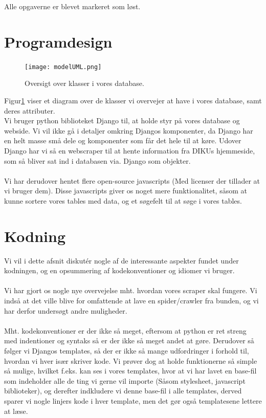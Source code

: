 \documentclass[11pt]{article}
\begin{document}
Alle opgaverne er blevet markeret som løst.

\section{Programdesign}
\begin{figure}[H]
	\centering
	\texttt{[image: modelUML.png]}
	\caption{Oversigt over klasser i vores database.}
	\label{fig:UML}
\end{figure}

Figur\ref{fig:UML} viser et diagram over de klasser vi overvejer at have i vores database, samt deres attributer. \\

Vi bruger python biblioteket Django til, at holde styr på vores database og webside. Vi vil ikke gå i detaljer omkring Djangos komponenter, da Django har en helt masse små dele og komponenter som får det hele til at køre.
Udover Django har vi så en webscraper til at hente information fra DIKUs hjemmeside, som så bliver sat ind i databasen via. Django som objekter. \\ \\

Vi har derudover hentet flere open-source javascripts (Med licenser der tillader at vi bruger dem). Disse javascripts giver os noget mere funktionalitet, såsom at kunne sortere vores tables med data, og et søgefelt til at søge i vores tables.

\section{Kodning}
Vi vil i dette afsnit diskutér nogle af de interessante aspekter fundet under kodningen, og en opsummering af kodekonventioner og idiomer vi bruger. \\ \\
Vi har gjort os nogle nye overvejelse mht. hvordan vores scraper skal fungere. Vi indså at det ville blive for omfattende at lave en spider/crawler fra bunden, og vi har derfor undersøgt andre muligheder. \\ \\
Mht. kodekonventioner er der ikke så meget, eftersom at python er ret streng med indentioner og syntaks så er der ikke så meget andet at gøre. Derudover så følger vi Djangos templates, så der er ikke så mange udfordringer i forhold til, hvordan vi hver især skriver kode. Vi prøver dog at holde funktionerne så simple så mulige, hvilket f.eks. kan ses i vores templates, hvor at vi har lavet en base-fil som indeholder alle de ting vi gerne vil importe (Såsom stylesheet, javascript biblioteker), og derefter indkludere vi denne base-fil i alle templates, derved sparer vi nogle linjers kode i hver template, men det gør også templatesene lettere at læse.
\end{document}
